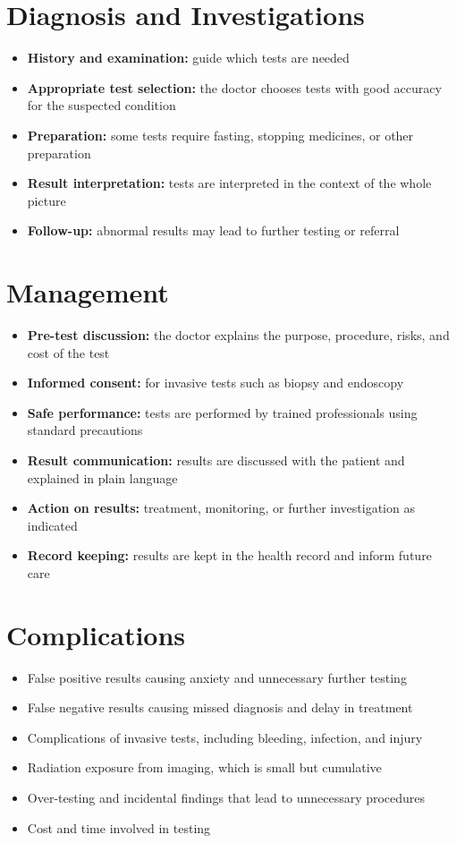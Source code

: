 \section*{Diagnosis and Investigations}
\begin{itemize}
    \item \textbf{History and examination:} guide which tests are needed
    \item \textbf{Appropriate test selection:} the doctor chooses tests with good accuracy for the suspected condition
    \item \textbf{Preparation:} some tests require fasting, stopping medicines, or other preparation
    \item \textbf{Result interpretation:} tests are interpreted in the context of the whole picture
    \item \textbf{Follow-up:} abnormal results may lead to further testing or referral
\end{itemize}

\section*{Management}
\begin{itemize}
    \item \textbf{Pre-test discussion:} the doctor explains the purpose, procedure, risks, and cost of the test
    \item \textbf{Informed consent:} for invasive tests such as biopsy and endoscopy
    \item \textbf{Safe performance:} tests are performed by trained professionals using standard precautions
    \item \textbf{Result communication:} results are discussed with the patient and explained in plain language
    \item \textbf{Action on results:} treatment, monitoring, or further investigation as indicated
    \item \textbf{Record keeping:} results are kept in the health record and inform future care
\end{itemize}

\section*{Complications}
\begin{itemize}
    \item False positive results causing anxiety and unnecessary further testing
    \item False negative results causing missed diagnosis and delay in treatment
    \item Complications of invasive tests, including bleeding, infection, and injury
    \item Radiation exposure from imaging, which is small but cumulative
    \item Over-testing and incidental findings that lead to unnecessary procedures
    \item Cost and time involved in testing
\end{itemize}

